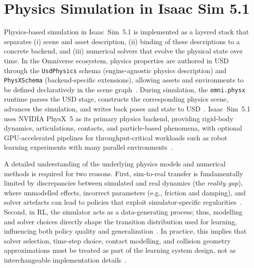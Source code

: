 
\section{Physics Simulation in Isaac Sim 5.1}
\label{sec:physics_sim}

Physics-based simulation in Isaac~Sim~5.1 is implemented as a layered stack that separates
(i) scene and asset description, (ii) binding of these descriptions to a concrete backend, and
(iii) numerical solvers that evolve the physical state over time.
In the Omniverse ecosystem, physics properties are authored in \ac{USD} through the
\texttt{UsdPhysics} schema (engine-agnostic physics description) and \texttt{PhysXSchema}
(backend-specific extensions), allowing assets and environments to be defined declaratively in
the scene graph~\cite{openusd_usdphysics_schema,omni_physx_overview}.
During simulation, the \texttt{omni.physx} runtime parses the \ac{USD} stage, constructs the
corresponding physics scene, advances the simulation, and writes back poses and state to
\ac{USD}~\cite{omni_physx_overview}.
Isaac~Sim~5.1 uses NVIDIA PhysX~5 as its primary physics backend, providing rigid-body
dynamics, articulations, contacts, and particle-based phenomena, with optional
\ac{GPU}-accelerated pipelines for throughput-critical workloads such as robot learning
experiments with many parallel environments~\cite{isaac_sim_simulation_fundamentals_510,physx_welcome_513,physx_gpu_rigid_bodies_510}.

A detailed understanding of the underlying physics models and numerical methods is
required for two reasons.
First, sim-to-real transfer is fundamentally limited by discrepancies between simulated and
real dynamics (the \emph{reality gap}), where unmodelled effects, incorrect parameters (e.g.,
friction and damping), and solver artefacts can lead to policies that exploit simulator-specific
regularities~\cite{Jakobi1995RealityGap,Salvato2021RealityGapSurvey}.
Second, in \ac{RL}, the simulator acts as a data-generating process; thus, modelling and solver
choices directly shape the transition distribution used for learning, influencing both policy
quality and generalization~\cite{Salvato2021RealityGapSurvey,Peng2018DynamicsRandomization}.
In practice, this implies that solver selection, time-step choice, contact modelling, and
collision geometry approximations must be treated as part of the learning system design, not
as interchangeable implementation details~\cite{Peng2018DynamicsRandomization,physx_best_practices_541}.


